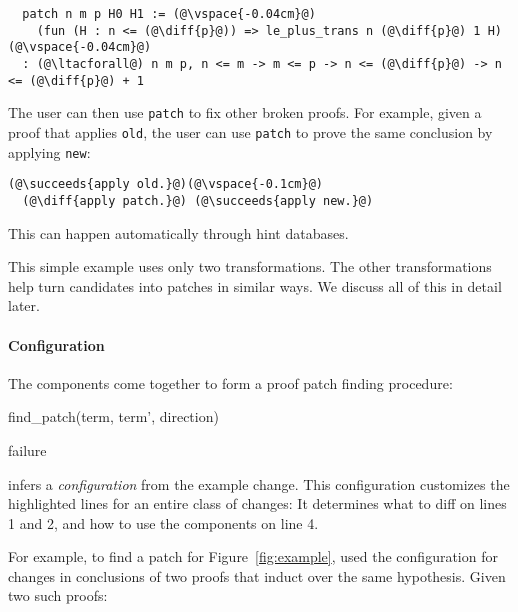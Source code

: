 \begin{lstlisting}
  patch n m p H0 H1 := (@\vspace{-0.04cm}@)
    (fun (H : n <= (@\diff{p}@)) => le_plus_trans n (@\diff{p}@) 1 H)(@\vspace{-0.04cm}@)
  : (@\ltacforall@) n m p, n <= m -> m <= p -> n <= (@\diff{p}@) -> n <= (@\diff{p}@) + 1
\end{lstlisting}
The user can then use \lstinline{patch} to fix other broken proofs.
For example, given a proof that applies \lstinline{old}, the user can use \lstinline{patch} to prove the same conclusion
by applying \lstinline{new}:

\begin{lstlisting}[language=coq]
  (@\succeeds{apply old.}@)(@\vspace{-0.1cm}@)
  (@\diff{apply patch.}@) (@\succeeds{apply new.}@)
\end{lstlisting}
This can happen automatically through hint databases.

This simple example uses only two transformations. The other transformations help turn candidates
into patches in similar ways. We discuss all of this in detail later.

\paragraph{Configuration}

The components come together to form a proof patch finding procedure:

\begin{algorithm}
\begin{algorithmic}[1]
\renewcommand{\thealgorithm}{}
\footnotesize
\caption{\footnotesize{find\_patch(term, term', direction)}}
    \STATE {}
    \STATE {}
      \STATE {}
    \ENDIF
    \RETURN failure
\end{algorithmic}
\label{alg:patching}	
\end{algorithm}
\sysname infers a \textit{configuration} from the example change.
This configuration customizes the highlighted lines for an entire class of changes:
It determines what to diff on lines 1 and 2,
and how to use the components on line 4.

For example, to find a patch for Figure~\ref{fig:example},
\sysname used the configuration for changes in conclusions of two proofs
that induct over the same hypothesis. Given two such
proofs:

